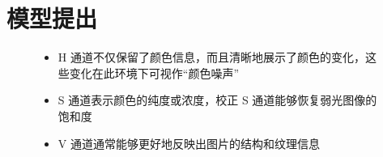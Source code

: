 \documentclass[CJK,aspectratio=169]{beamer}  %
\begin{document}
	\section{模型提出}
	\begin{frame}
		\begin{figure}
			\centering			
			\begin{minipage}{.4\columnwidth}
				\begin{itemize}
					\item {} \yahei %
					
					H 通道不仅保留了颜色信息，而且清晰地展示了颜色的变化，这些变化在此环境下可视作“颜色噪声”
					
					
					
					\vspace{0.5cm}
					\item {} \yahei
					S 通道表示颜色的纯度或浓度，校正 S 通道能够恢复弱光图像的饱和度
					
					\vspace{0.5cm}
					\item {} \yahei
					V 通道通常能够更好地反映出图片的结构和纹理信息
					

\end{itemize}
\end{minipage}
\end{figure}
\end{frame}
\end{document}
